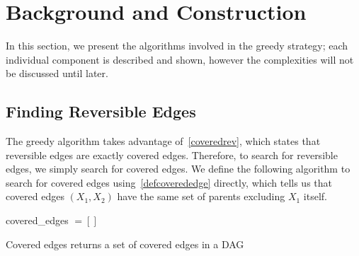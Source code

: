 \section{Background and Construction}\label{section:bgandconstruction}
\null \quad \quad In this section, we present the algorithms involved in the greedy strategy; each individual component is described and shown, however the complexities will not be discussed until later. 

\subsection{Finding Reversible Edges}
\null \quad \quad The greedy algorithm takes advantage of~\cref{coveredrev}, which states that reversible edges are exactly covered edges. Therefore, to search for reversible edges, we simply search for covered edges. We define the following algorithm to search for covered edges using~\cref{defcoverededge} directly, which tells us that covered edges $(X_{1},X_{2})$ have the same set of parents excluding $X_{1}$ itself.

\begin{algorithm}[h!]\label{findcoverededges}
\DontPrintSemicolon
{}
\begin{spacing}{1.25}

covered\_edges $= []$ \;
 {
  }
\;
\end{spacing}

\caption{{\sc Covered edges} returns a set of covered edges in a DAG}
\label{algo:coverededges}
\end{algorithm}

